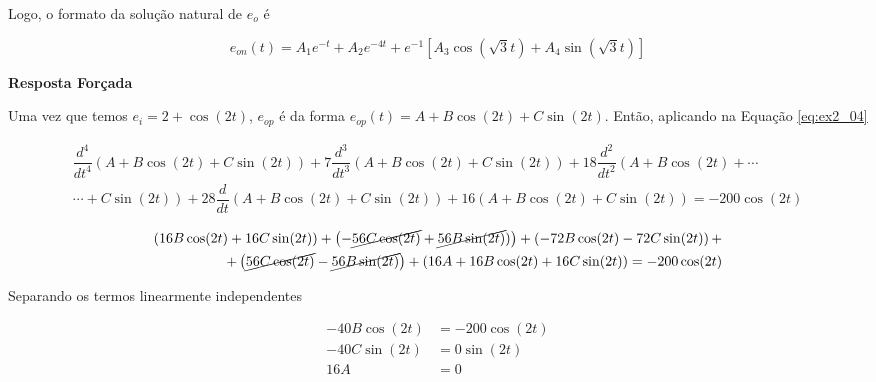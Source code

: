 \documentclass{article}
\numberwithin{equation}{section}
\let\dfr\dfrac
\begin{document}
\noindent Logo, o formato da solução natural de $e_o$ é

\begin{equation*}
    e_{on}(t) = A_1e^{-t} + A_2e^{-4t} + e^{-1}\left[A_3\cos\left(\sqrt{3}t\right)+A_4\sin\left(\sqrt{3}t\right)\right]
\end{equation*}

\begin{center}
    \textbf{Resposta Forçada}
\end{center}

\noindent Uma vez que temos $e_i = 2 + \cos(2t)$, $e_{op}$ é da forma $e_{op}(t) = A + B\cos(2t) + C\sin(2t)$. Então, aplicando na Equação \eqref{eq:ex2_04}

\begin{equation*}
    \begin{split}
        \dfr{d^4}{dt^4}\left(A + B\cos(2t) + C\sin(2t)\right) + 7\dfr{d^3}{dt^3}\left(A + B\cos(2t) + C\sin(2t)\right) + 18\dfr{d^2}{dt^2}\left(A + B\cos(2t) +\right.\cdots\\
        \left.\cdots+C\sin(2t)\right) + 28\dfr{d}{dt}\left(A + B\cos(2t) + C\sin(2t)\right) + 16\left(A + B\cos(2t) + C\sin(2t)\right) = -200\cos(2t)
    \end{split}
\end{equation*}

\begin{equation*}
    \begin{split}
        \left(16B\cos(2t) + 16C\sin(2t)\right) + \left(-\cancel{56C\cos(2t)}+ \cancel{56B\sin(2t)})\right) + \left(-72B\cos(2t) -72C\sin(2t)\right) +\\
        +\left(\cancel{56C\cos(2t)} -\cancel{56B\sin(2t)}\right)+\left(16A + 16B\cos(2t) + 16C\sin(2t)\right)= -200\cos(2t)
    \end{split}
\end{equation*}

\vspace{1mm}

\noindent Separando os termos linearmente independentes

\begin{equation*}
    \begin{split}
        -40B\cos(2t) &= -200\cos(2t)\\
        -40C\sin(2t) &= 0\sin(2t)\\
        16A &= 0
    \end{split}
\end{equation*}
\end{document}
